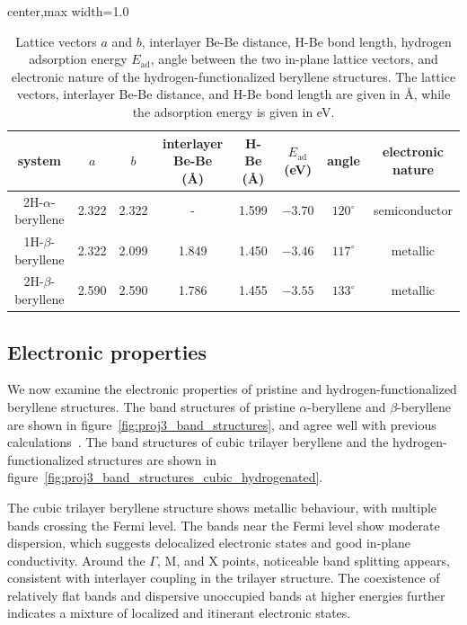 \begin{table}[!htbp]
\centering
{}
\begin{adjustbox}{center,max width=1.0\linewidth}
\begin{tabular}{cccccccc}
\hline
\rowcolor{gray!25}
system
& $a$
& $b$
& interlayer Be-Be (\AA)
& H-Be (\AA)
& $E_{\mathrm{ad}}$ (eV)
& angle
& electronic nature \\ \hline
2H-$\alpha$-beryllene
& 2.322 & 2.322 & - & 1.599 & $-3.70$ & $120^{\circ}$ & semiconductor \\
1H-$\beta$-beryllene
& 2.322 & 2.099 & 1.849 & 1.450 & $-3.46$ & $117^{\circ}$ & metallic \\
2H-$\beta$-beryllene
& 2.590 & 2.590 & 1.786 & 1.455 & $-3.55$ & $133^{\circ}$ & metallic \\
\hline
\end{tabular}
\end{adjustbox}
\caption{Lattice vectors $a$ and $b$,
interlayer Be-Be distance, H-Be bond length,
hydrogen adsorption energy $E_{\mathrm{ad}}$,
angle between the two in-plane lattice vectors,
and electronic nature of the hydrogen-functionalized beryllene structures.
The lattice vectors, interlayer Be-Be distance,
and H-Be bond length are given in \si{\angstrom},
while the adsorption energy is given in \si{\electronvolt}.}
\label{tab:proj3_hydrogenated_structural_parameters}
\end{table}

\subsection{Electronic properties}
\label{3_electronic_properties}

We now examine the electronic properties of pristine and hydrogen-functionalized beryllene structures.
The band structures of pristine $\alpha$-beryllene and $\beta$-beryllene are shown in figure~\ref{fig:proj3_band_structures},
and agree well with previous calculations~\cite{li2023coexistence}.
The band structures of cubic trilayer beryllene and the hydrogen-functionalized structures are shown in figure~\ref{fig:proj3_band_structures_cubic_hydrogenated}.

The cubic trilayer beryllene structure shows metallic behaviour,
with multiple bands crossing the Fermi level.
The bands near the Fermi level show moderate dispersion,
which suggests delocalized electronic states and good in-plane conductivity.
Around the $\Gamma$,
$\mathrm{M}$,
and $\mathrm{X}$ points,
noticeable band splitting appears,
consistent with interlayer coupling in the trilayer structure.
The coexistence of relatively flat bands and dispersive unoccupied bands at higher energies further indicates a mixture of localized and itinerant electronic states.

